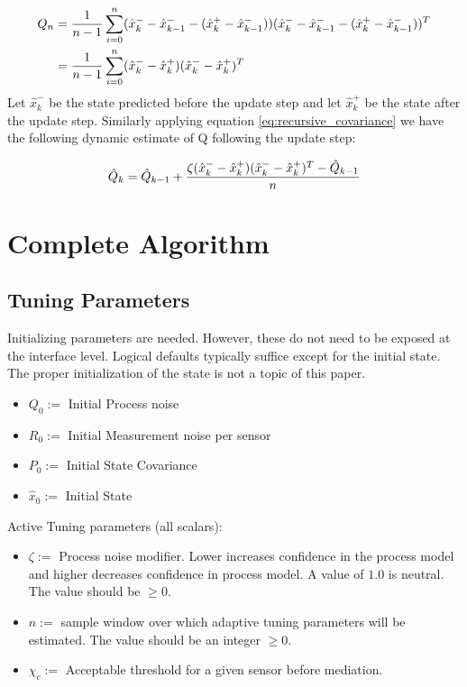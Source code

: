 \documentclass[a4paper]{article}
\begin{document}
	\begin{align*}
		Q_n &= {1 \over n - 1} \displaystyle\sum_{i=0} ^{n}(\hat{x}_k^- - \hat{x}_{k-1}^- - (\hat{x}_k^+ - \hat{x}_{k-1}^-))(\hat{x}_k^- - \hat{x}_{k-1}^- - (\hat{x}_k^+ - \hat{x}_{k-1}^-))^T\\
		&= {1 \over n - 1} \displaystyle\sum_{i=0} ^{n}(\hat{x}_k^- - \hat{x}_k^+)(\hat{x}_k^- - \hat{x}_k^+)^T\\
	\end{align*}
	Let $\hat{x}_k^-$ be the state predicted before the update step and let $\hat{x}_k^+$ be the state after the update step. Similarly applying equation \ref{eq:recursive_covariance} we have the following dynamic estimate of Q following the update step:

	\begin{equation}
	\hat{Q}_k = \hat{Q}_{k-1} + {\zeta (\hat{x}_k^- - \hat{x}_k^+)(\hat{x}_k^- - \hat{x}_k^+)^T - \hat{Q}_{k-1} \over n}
	\end{equation}

	\section{Complete Algorithm}

	\subsection{Tuning Parameters}
	Initializing parameters are needed. However, these do not need to be exposed at the interface level. Logical defaults typically suffice except for the initial state. The proper initialization of the state is not a topic of this paper.
	\begin{itemize}
		\item $Q_0 :=$ Initial Process noise
		\item $R_0 :=$ Initial Measurement noise per sensor
		\item $P_0 :=$ Initial State Covariance
		\item $\hat{x}_0 :=$ Initial State
	\end{itemize}

	Active Tuning parameters (all scalars):
		\begin{itemize}
		\item $\zeta :=$ Process noise modifier. Lower increases confidence in the process model and higher decreases confidence in process model. A value of $1.0$ is neutral. The value should be $\geq 0$.
		\item $n :=$ sample window over which adaptive tuning parameters will be estimated. The value should be an integer $\geq 0$.
		\item $\chi_c :=$ Acceptable threshold for a given sensor before mediation.
	\end{itemize}
\end{document}
